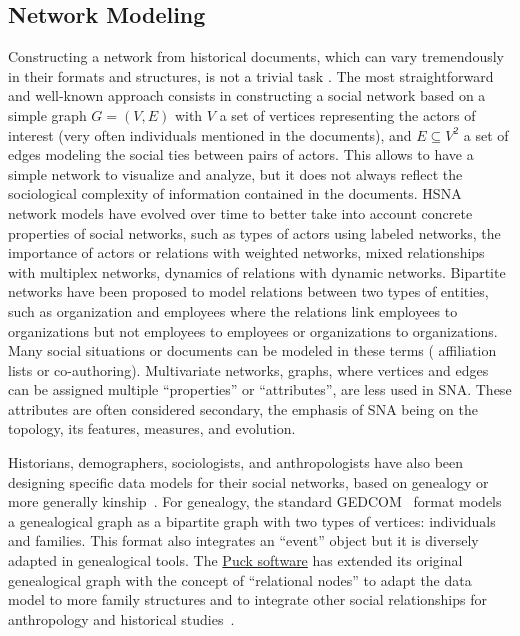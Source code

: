\subsection{Network Modeling}

Constructing a network from historical documents, which can vary tremendously in their formats and structures, is not a trivial task \cite{alkadi2022}.
The most straightforward and well-known approach consists in constructing a social network based on a simple graph $G = (V, E)$ with $V$ a set of vertices representing the actors of interest (very often individuals mentioned in the documents), and $E \subseteq V^2$ a set of edges modeling the social ties between pairs of actors.
This allows to have a simple network to visualize and analyze, but it does not always reflect the sociological complexity of information contained in the documents.
HSNA network models have evolved over time to better take into account concrete properties of social networks, such as types of actors using labeled networks, the importance of actors or relations with weighted networks, mixed relationships with multiplex networks, dynamics of relations with dynamic networks.
Bipartite networks have been proposed to model relations between two types of entities, such as organization and employees where the relations link employees to organizations but not employees to employees or organizations to organizations.
Many social situations or documents can be modeled in these terms (%
affiliation lists or co-authoring).
Multivariate networks, \ie graphs, where vertices and edges can be assigned multiple ``properties'' or ``attributes'', are less used in SNA\@.
These attributes are often considered secondary, the emphasis of SNA being on the topology, its features, measures, and evolution.

Historians, demographers, sociologists, and anthropologists have also been designing specific data models for their social networks, based on genealogy or more generally kinship~\cite{hambergerKinshipNetworkAnalysis2011}.
For genealogy, the standard GEDCOM~\cite{gedcom} format models a genealogical graph as a bipartite graph with two types of vertices: individuals and families.
This format also integrates an ``event'' object but it is diversely adapted in genealogical tools.
The \href{https://www.kintip.net/}{Puck software} has extended its original genealogical graph with the concept of ``relational nodes'' to adapt the data model to more family structures and to integrate other social relationships for anthropology and historical studies~\cite{hambergerScanningPatternsRelationship2014}.






